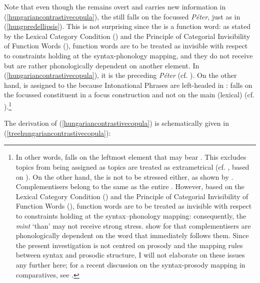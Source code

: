Note that even though the  remains overt and carries new information in (\ref{hungariancontrastivecopula}), the  still falls on the focussed  \textit{Péter}, just as in (\ref{hungpredellipsis}). This is not surprising since the  is a function word: as stated by the Lexical Category Condition (\citealt[226]{truckenbrodt1999}) and the Principle of Categorial Invisibility of Function Words (\citealt[226]{selkirk1984}), function words are to be treated as invisible with respect to constraints holding at the syntax-phonology mapping, and they do not receive  but are rather phonologically dependent on another element. In (\ref{hungariancontrastivecopula}), it is the preceding  \textit{Péter} (cf. \citealt[74]{ekiss2002}). On the other hand,  is assigned to the  because Intonational Phrases are left-headed in :  falls on the focussed constituent in a focus construction and not on the main (lexical)  (cf. \citealt[50--53]{szendroi2001diss}).\footnote{In other words,  falls on the leftmost element that may bear . This excludes topics from being assigned  as topics are treated as extrametrical (cf. \citealt[49]{szendroi2001diss}, based on \citealt{truckenbrodt1999}). On the other hand, the  is not to be stressed either, as shown by \citet{keneseivogel1989, keneseivogel1995}. Complementisers belong to the same  as the entire . However, based on the Lexical Category Condition (\citealt[226]{truckenbrodt1999}) and the Principle of Categorial Invisibility of Function Words (\citealt[226]{selkirk1984}), function words are to be treated as invisible with respect to constraints holding at the syntax–phonology mapping: consequently, the  \textit{mint} `than' may not receive strong stress. \citet{satodobashi2012} show for  that complementisers are phonologically dependent on the word that immediately follows them. Since the present investigation is not centred on prosody and the mapping rules between syntax and prosodic structure, I will not elaborate on these issues any further here; for a recent discussion on the syntax-prosody mapping in  comparatives, see \citet{bacskaiatkari2013vllxx}.}

\largerpage[1]
The derivation of (\ref{hungariancontrastivecopula}) is schematically given in (\ref{treehungariancontrastivecopula}):

